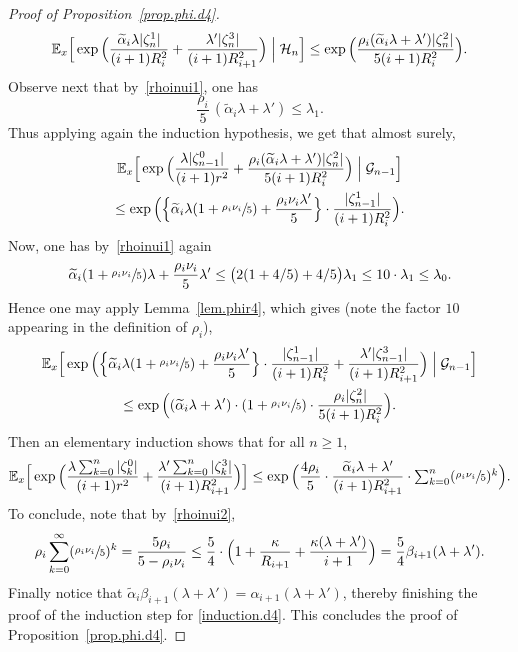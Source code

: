 \documentclass[11pt]{article}
\numberwithin{equation}{section}
\let\ts\textstyle
\theoremstyle{plain}
\theoremstyle{definition}
\newcommand{\1}{{\text{\Large $\mathfrak 1$}}}
\begin{document}
\begin{proof}[Proof of Proposition~\ref{prop.phi.d4}]
\[
\mathbb E_x\Big[\exp\Big(\frac{\widetilde \alpha_i\lambda |\zeta_n^1|}{(i+1)R_i^2}+ \frac{\lambda' |\zeta^3_n|}{(i+1)R_{i+1}^2}\Big)
\Bigm|\mathcal H_n \Big] \le
\exp\Big(\frac{\rho_i(\widetilde \alpha_i \lambda + \lambda') |\zeta_n^2|}{5(i+1)R_i^2}\Big).
\]
Observe next that by~\eqref{rhoinui1}, one has
\[
\frac{\rho_i}{5}\,(\widetilde \alpha_i \lambda + \lambda')\le \lambda_1.
\]
Thus applying again the induction hypothesis, we get that almost surely,
\begin{multline*}
\mathbb E_x\Big[\exp\Big(\frac{\lambda |\zeta_{n-1}^0|}{(i+1)r^2}+ \frac{\rho_i(\widetilde \alpha_i \lambda + \lambda') |\zeta_n^2|}{5(i+1)R_i^2}\Big) \Bigm|\mathcal G_{n-1} \Big]\\
\le \exp \Big(\Big\{ \widetilde \alpha_i \lambda(1 +\sfrac{\rho_i\nu_i}{5}) + \frac{\rho_i\nu_i\lambda'}{5}\Big\} \cdot \frac{|\zeta_{n-1}^1|}{(i+1)R_i^2}\Big).
\end{multline*}
Now, one has by~\eqref{rhoinui1} again
\[
\widetilde \alpha_i(1+\sfrac{\rho_i\nu_i}{5})\lambda + \frac{\rho_i\nu_i}{5}\lambda' \le \big(2(1+4/5) +4/5\big)\lambda_1 \le 10\cdot \lambda_1 \le \lambda_0.
\]
Hence one may apply Lemma~\ref{lem.phir4}, which gives (note the factor $10$ appearing in the definition of $\rho_i$),
\begin{multline*}
\mathbb E_x\Big[\exp \Big(\Big\{ \widetilde \alpha_i\lambda(1 +\sfrac{\rho_i\nu_i}{5}) + \frac{\rho_i\nu_i\lambda'}{5}\Big\} \cdot \frac{|\zeta_{n-1}^1|}{(i+1)R_i^2}+ \frac{\lambda'|\zeta_{n-1}^3|}{(i+1)R_{i+1}^2}\Big)\Bigm| \mathcal G_{n-1} \Big] \\
\le \exp\Big((\widetilde \alpha_i\lambda + \lambda')\cdot(1+\sfrac{\rho_i\nu_i}{5})\cdot \frac{ \rho_i |\zeta_n^2|}{5(i+1)R_i^2}\Big).
\end{multline*}
Then an elementary induction shows that for all $n\ge 1$,
\[
\mathbb E_x\Big[\exp\Big(\frac{\lambda\sum_{k=0}^n |\zeta_k^0|}{(i+1)r^2}+\frac{\lambda'\sum_{k=0}^n |\zeta^3_k|}{(i+1)R_{i+1}^2}\Big)\Big]
\le \exp\Big(\frac{4\rho_i}{5}\cdot \frac{ \widetilde \alpha_i\lambda+\lambda'}{(i+1)R_{i+1}^2}\cdot \ts\sum_{k=0}^n (\sfrac{\rho_i\nu_i}{5})^{k}\Big).
\]
To conclude, note that by~\eqref{rhoinui2},\vspace*{-3pt}
\[
\rho_i\sum_{k=0}^\infty (\sfrac{\rho_i\nu_i}{5})^{k} = \frac{5\rho_i}{5-\rho_i\nu_i} \le \frac{5}{4}\cdot \Big(1+\frac{\kappa }{R_{i+1}} + \frac{\kappa(\lambda+\lambda')}{i+1}\Big) =\frac 54 \beta_{i+1}(\lambda+\lambda').
\]
Finally notice that $\widetilde \alpha_i \beta_{i+1}(\lambda+\lambda') = \alpha_{i+1}(\lambda+\lambda')$, thereby finishing the proof of the induction
step for \eqref{induction.d4}.
This concludes the proof of Proposition~\ref{prop.phi.d4}.
\end{proof}
\end{document}
